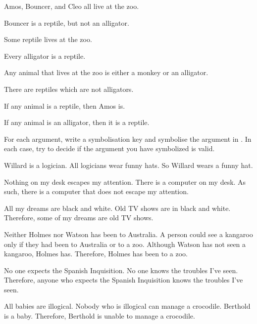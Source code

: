 \begin{earg}
\item Amos, Bouncer, and Cleo all live at the zoo. 
\item Bouncer is a reptile, but not an alligator. 
\item Some reptile lives at the zoo. 
\item Every alligator is a reptile. 
\item Any animal that lives at the zoo is either a monkey or an alligator. 
\item There are reptiles which are not alligators.
\item If any animal is a reptile, then Amos is.
\item If any animal is an alligator, then it is a reptile.
\end{earg}


\problempart
\label{pr.FOLarguments}
For each argument, write a symbolisation key and symbolise the argument in \FOL. In each case, try to decide if the argument you have symbolized is valid.
\begin{earg}
\item Willard is a logician. All logicians wear funny hats. So Willard wears a funny hat.
\item Nothing on my desk escapes my attention. There is a computer on my desk. As such, there is a computer that does not escape my attention.
\item All my dreams are black and white. Old TV shows are in black and white. Therefore, some of my dreams are old TV shows.
\item Neither Holmes nor Watson has been to Australia. A person could see a kangaroo only if they had been to Australia or to a zoo. Although Watson has not seen a kangaroo, Holmes has. Therefore, Holmes has been to a zoo.
\item No one expects the Spanish Inquisition. No one knows the troubles I've seen. Therefore, anyone who expects the Spanish Inquisition knows the troubles I've seen.
\item All babies are illogical. Nobody who is illogical can manage a crocodile. Berthold is a baby. Therefore, Berthold is unable to manage a crocodile.
\end{earg}



